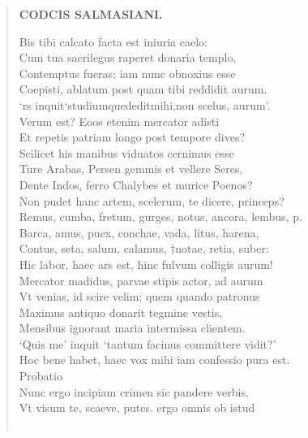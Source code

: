 \documentclass[11pt, a4paper]{report}
\begin{document}
\begin{verse}
    \begin{center} \textbf{CODCIS SALMASIANI.} \end{center} \marginpar{[89]} Bis tibi calcato facta est iniuria caelo: \\ Cum tua sacrilegus raperet donaria templo, \\ Contemptus fueras; iam nunc obnoxius esse \\ Coepisti, ablatum post \lbrack quam \rbrack  tibi reddidit aurum. \\ ‘rs inquit‘studiumquededitmihi,non scelus, aurum’. \\ Verum est? Eoos etenim mercator adisti \\ Et repetis patriam longo post tempore dives? \\ Scilicet his manibus viduatos cernimus esse \\ Ture Arabas, Persen gemmis et vellere Seres, \\ Dente Indos, ferro Chalybes et murice Poenos? \\ Non pudet hanc artem, scelerum,  \lbrack te \rbrack  dicere, princeps? \\ Remus, cumba, fretum, gurges, notus, ancora, lembus, p. \\ Barca, amus, puex, conchae, vada, litus, harena, \\ Contus, seta, salum, calamus, †notae, retia, suber: \\ Hic labor, haec ars est, hinc fulvum colligis aurum! \\ Mercator madidus, parvae stipis actor, ad aurum \\ Vt venias,  \lbrack id \rbrack  scire velim; quem quando patronus \\ Maximus antiquo donarit tegmine vestis, \\ Mensibus ignorant maria intermissa clientem. \\ ‘Quis me’ inquit ‘tantum facinus committere vidit?’ \\ Hoc bene habet, haec vox mihi  \lbrack iam confessio pura est. \\  \lbrack Probatio \rbrack  \\ Nunc ergo incipiam crimen sic pandere verbis, \\ Vt visum te, scaeve, putes. ergo omnis ob istud \\ 
        ﻿\pagebreak 

\end{verse}
\end{document}
